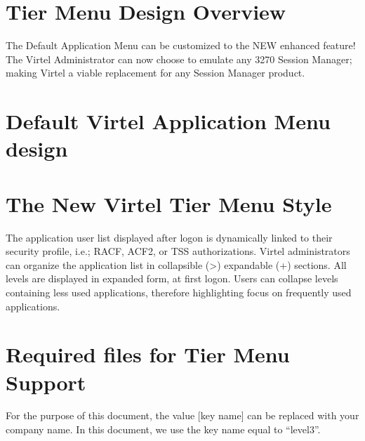 \documentclass[letterpaper,10pt,english]{sphinxmanual}
\begin{document}
\section{Tier Menu Design Overview}
\label{\detokenize{Customization:tier-menu-design-overview}}
The Default Application Menu can be customized to the NEW enhanced feature!  The Virtel Administrator can now choose to emulate any 3270 Session Manager; making Virtel a viable replacement for any Session Manager product.


\section{Default Virtel Application Menu design}
\label{\detokenize{Customization:default-virtel-application-menu-design}}



\section{The New Virtel Tier Menu Style}
\label{\detokenize{Customization:the-new-virtel-tier-menu-style}}
The application user list displayed after logon is dynamically linked to their security profile, i.e.; RACF, ACF2, or TSS authorizations. Virtel administrators can organize the application list in collapsible (\textgreater{}) expandable (+) sections. All levels are displayed in expanded form, at first logon. Users can collapse levels containing less used applications, therefore highlighting focus on frequently used applications.




\section{Required files for Tier Menu Support}
\label{\detokenize{Customization:required-files-for-tier-menu-support}}
For the purpose of this document, the value {[}key name{]} can be replaced with your company name. In this document, we use the key name equal to “level3”.

\end{document}
